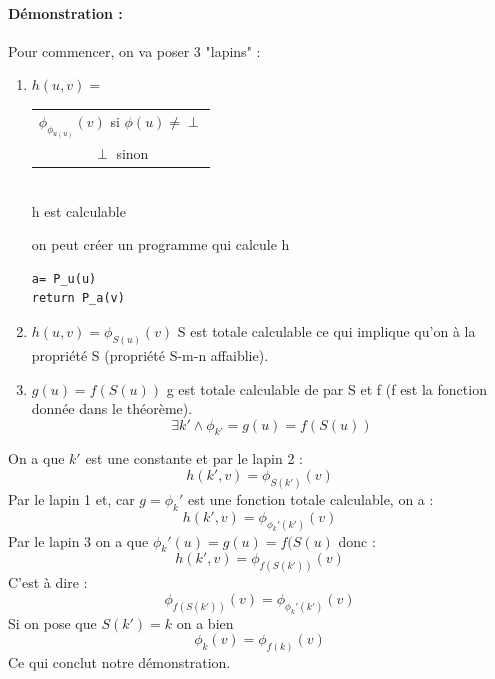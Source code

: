 \paragraph{Démonstration :}
Pour commencer, on va poser 3 "lapins" :
\begin{enumerate}
	\item $h(u,v) =$
		\begin{tabular}{c}
			$\phi_{\phi_{u(u)}}(v)$ si $\phi(u)\neq \perp$\\
			$\perp$ sinon
		\end{tabular}\\
		h est calculable 
		\begin{myrem}
			on peut créer un programme qui calcule h
\begin{lstlisting}
a= P_u(u)
return P_a(v)
\end{lstlisting}
		\end{myrem}
	\item $h(u,v)=\phi_{S(u)}(v)$ S est totale calculable ce qui implique
		qu'on à la propriété S (propriété S-m-n affaiblie).
	\item $g(u)=f(S(u))$ g est totale calculable de par S et f (f
		est la fonction donnée dans le théorème).
		\[ \exists k' \land \phi_{k'} =g(u)=f(S(u)) \]
\end{enumerate}
On a que $k'$ est une constante et par le lapin 2 :
\[h(k',v) = \phi_{S(k')}(v)\]
Par le lapin 1 et, car $g=\phi_k'$ est une fonction totale calculable, on a :
\[h(k',v) = \phi_{\phi_k'(k')}(v)\]
Par le lapin 3 on a que $\phi_k'(u) = g(u)=f(S(u)$ donc :
\[h(k',v) = \phi_{f(S(k'))}(v)\]
C'est à dire :
\[ \phi_{f(S(k'))}(v) =\phi_{\phi_k'(k')}(v) \]
Si on pose que $S(k')=k$ on a bien 
\[ \phi_{k}(v) = \phi_{f(k)}(v) \]
Ce qui conclut notre démonstration.

